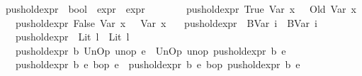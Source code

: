 \begin{isabellebody}
\ push{\isacharunderscore}{\kern0pt}old{\isacharunderscore}{\kern0pt}expr\ {\isacharcolon}{\kern0pt}{\isacharcolon}{\kern0pt}\ {\isachardoublequoteopen}bool\ {\isasymRightarrow}\ expr\ {\isasymRightarrow}\ expr{\isachardoublequoteclose}\isanewline
\ \ \ \isanewline
\ \ \ \ {\isachardoublequoteopen}push{\isacharunderscore}{\kern0pt}old{\isacharunderscore}{\kern0pt}expr\ True\ {\isacharparenleft}{\kern0pt}Var\ x{\isacharparenright}{\kern0pt}\ \ {\isacharequal}{\kern0pt}\ Old\ {\isacharparenleft}{\kern0pt}Var\ x{\isacharparenright}{\kern0pt}{\isachardoublequoteclose}\isanewline
\ \ {\isacharbar}{\kern0pt}\ {\isachardoublequoteopen}push{\isacharunderscore}{\kern0pt}old{\isacharunderscore}{\kern0pt}expr\ False\ {\isacharparenleft}{\kern0pt}Var\ x{\isacharparenright}{\kern0pt}\ \ {\isacharequal}{\kern0pt}\ {\isacharparenleft}{\kern0pt}Var\ x{\isacharparenright}{\kern0pt}{\isachardoublequoteclose}\isanewline
\ \ {\isacharbar}{\kern0pt}\ {\isachardoublequoteopen}push{\isacharunderscore}{\kern0pt}old{\isacharunderscore}{\kern0pt}expr\ {\isacharunderscore}{\kern0pt}\ {\isacharparenleft}{\kern0pt}BVar\ i{\isacharparenright}{\kern0pt}\ {\isacharequal}{\kern0pt}\ BVar\ i{\isachardoublequoteclose}\isanewline
\ \ {\isacharbar}{\kern0pt}\ {\isachardoublequoteopen}push{\isacharunderscore}{\kern0pt}old{\isacharunderscore}{\kern0pt}expr\ {\isacharunderscore}{\kern0pt}\ {\isacharparenleft}{\kern0pt}Lit\ l{\isacharparenright}{\kern0pt}\ {\isacharequal}{\kern0pt}\ Lit\ l{\isachardoublequoteclose}\isanewline
\ \ {\isacharbar}{\kern0pt}\ {\isachardoublequoteopen}push{\isacharunderscore}{\kern0pt}old{\isacharunderscore}{\kern0pt}expr\ b\ {\isacharparenleft}{\kern0pt}UnOp\ unop\ e{\isacharparenright}{\kern0pt}\ {\isacharequal}{\kern0pt}\ UnOp\ unop\ {\isacharparenleft}{\kern0pt}push{\isacharunderscore}{\kern0pt}old{\isacharunderscore}{\kern0pt}expr\ b\ e{\isacharparenright}{\kern0pt}{\isachardoublequoteclose}\isanewline
\ \ {\isacharbar}{\kern0pt}\ {\isachardoublequoteopen}push{\isacharunderscore}{\kern0pt}old{\isacharunderscore}{\kern0pt}expr\ b\ {\isacharparenleft}{\kern0pt}e{}\ {\isasymguillemotleft}bop{\isasymguillemotright}\ e{}{\isacharparenright}{\kern0pt}\ {\isacharequal}{\kern0pt}\ {\isacharparenleft}{\kern0pt}push{\isacharunderscore}{\kern0pt}old{\isacharunderscore}{\kern0pt}expr\ b\ e{}{\isacharparenright}{\kern0pt}\ {\isasymguillemotleft}bop{\isasymguillemotright}\ {\isacharparenleft}{\kern0pt}push{\isacharunderscore}{\kern0pt}old{\isacharunderscore}{\kern0pt}expr\ b\ e{}{\isacharparenright}{\kern0pt}{\isachardoublequoteclose}\isanewline

\end{isabellebody}
